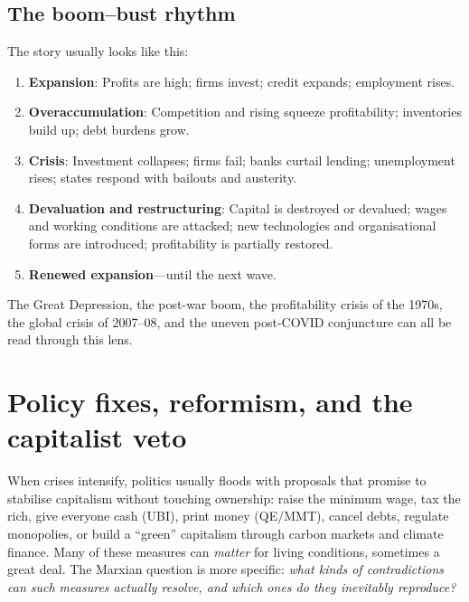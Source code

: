 \subsection{The boom–bust rhythm}

The story usually looks like this:

\begin{enumerate}[leftmargin=1.5em]
  \item \textbf{Expansion}: Profits are high; firms invest; credit expands;
  employment rises.

  \item \textbf{Overaccumulation}: Competition and rising \OCC{} squeeze
  profitability; inventories build up; debt burdens grow.

  \item \textbf{Crisis}: Investment collapses; firms fail; banks curtail
  lending; unemployment rises; states respond with bailouts and austerity.

  \item \textbf{Devaluation and restructuring}: Capital is destroyed or
  devalued; wages and working conditions are attacked; new technologies and
  organisational forms are introduced; profitability is partially restored.

  \item \textbf{Renewed expansion}---until the next wave.
\end{enumerate}

The Great Depression, the post-war boom, the profitability crisis of the
1970s, the global crisis of 2007--08, and the uneven post-COVID conjuncture
can all be read through this lens.\cite{Roberts2015,HarveyCompanion}



\section{Policy fixes, reformism, and the capitalist veto}
\label{sec:policy-fixes-veto}

When crises intensify, politics usually floods with proposals that promise to stabilise capitalism without
touching ownership: raise the minimum wage, tax the rich, give everyone cash (UBI), print money (QE/MMT),
cancel debts, regulate monopolies, or build a ``green'' capitalism through carbon markets and climate finance.
Many of these measures can \emph{matter} for living conditions, sometimes a great deal. The Marxian question is
more specific: \emph{what kinds of contradictions can such measures actually resolve, and which ones do they
inevitably reproduce?}

